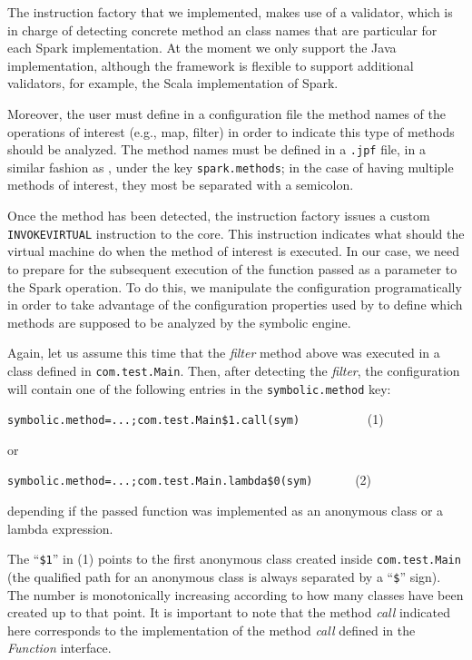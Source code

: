 The instruction factory that we implemented, makes use of a validator, which is in charge of detecting concrete method an class names that are particular for each Spark implementation. At the moment we only support the Java implementation, although the framework is flexible to support additional validators, for example, the Scala implementation of Spark.

Moreover, the user must define in a configuration file the method names of the operations of interest (e.g., map, filter) in order to indicate this type of methods should be analyzed. The method names must be defined in a \texttt{.jpf} file, in a similar fashion as \spf, under the key \texttt{spark.methods}; in the case of having multiple methods of interest, they most be separated with a semicolon.

Once the method has been detected, the instruction factory issues a custom \texttt{INVOKEVIRTUAL} instruction to the \jpf core. This instruction indicates what should the \jpf virtual machine do when the method of interest is executed. In our case, we need to prepare for the subsequent execution of the function passed as a parameter to the Spark operation. To do this, we manipulate the \jpf configuration programatically in order to take advantage of the configuration properties used by \spf to define which methods are supposed to be analyzed by the symbolic engine.

Again, let us assume this time that the \textit{filter} method above was executed in a class defined in \texttt{com.test.Main}. Then, after detecting the \textit{filter}, the configuration will contain one of the following entries in the \texttt{symbolic.method} key:

\hspace*{1cm} \lstinline[]|symbolic.method=...;com.test.Main$1.call(sym)|  ~~~~~~~~~~(1)

or

\hspace*{1cm} \lstinline[]|symbolic.method=...;com.test.Main.lambda$0(sym)|   ~~~~~~(2)

depending if the passed function was implemented as an anonymous class or a lambda expression. 

The ``\texttt{\$1}'' in (1) points to the first anonymous class created inside \texttt{com.test.Main} (the qualified path for an anonymous class is always separated by a ``\texttt{\$}'' sign). The number is monotonically increasing according to how many classes have been created up to that point. It is important to note that the method \textit{call} indicated here corresponds to the implementation of the method \textit{call} defined in the \textit{Function} interface.

